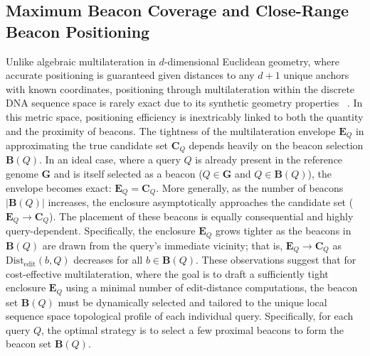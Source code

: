\documentclass[unnumsec,webpdf,contemporary,large]{oup-authoring-template}%
\theoremstyle{thmstyleone}%
\theoremstyle{thmstyletwo}%
\newtheorem{remark}{Remark}%
\theoremstyle{thmstylethree}%
\begin{document}



\subsection{Maximum Beacon Coverage and Close-Range Beacon Positioning}


Unlike algebraic multilateration in $d$-dimensional Euclidean geometry,
where accurate positioning is guaranteed given distances to any $d+1$ unique anchors with known coordinates,
positioning through multilateration within the discrete DNA sequence space is rarely exact due to its synthetic geometry properties ~\citep{malivert2023comparison, zafari2019survey, bertrand2021stratified}.
In this metric space, positioning efficiency is inextricably linked to both the quantity and the proximity of beacons.
The tightness of the multilateration envelope $\mathbf{E}_Q$ in approximating the true candidate set $\mathbf{C}_Q$ depends heavily on the beacon selection $\mathbf{B}(Q)$.
In an ideal case, where a query $Q$ is already present in the reference genome $\mathbf{G}$ and is itself selected as a beacon ($Q \in \mathbf{G}$ and $Q \in \mathbf{B}(Q)$),
the envelope becomes exact: $\mathbf{E}_Q = \mathbf{C}_Q$.
More generally, as the number of beacons $|\mathbf{B}(Q)|$ increases, the enclosure asymptotically approaches the candidate set ($\mathbf{E}_Q \rightarrow \mathbf{C}_Q$).
The placement of these beacons is equally consequential and highly query-dependent.
Specifically, the enclosure $\mathbf{E}_Q$ grows tighter as the beacons in $\mathbf{B}(Q)$ are drawn from the query’s immediate vicinity;
that is, $\mathbf{E}_Q \rightarrow \mathbf{C}_Q$ as $\mathrm{Dist}_{\mathrm{edit}}(b, Q)$ decreases for all $b \in \mathbf{B}(Q)$.
These observations suggest that for cost-effective multilateration, where the goal is to draft a sufficiently tight enclosure $\mathbf{E}_Q$ using a minimal number of edit-distance computations,
the beacon set $\mathbf{B}(Q)$ must be dynamically selected and tailored to the unique local sequence space topological profile of each individual query.
Specifically, for each query $Q$, the optimal strategy is to select a few proximal beacons to form the beacon set $\mathbf{B}(Q)$.
\end{document}
